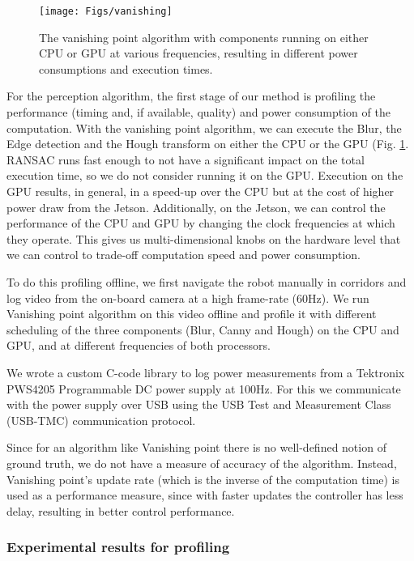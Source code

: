 \begin{figure}
	\centering
	\texttt{[image: Figs/vanishing]}
	\caption{The vanishing point algorithm with components running on either CPU or GPU at various frequencies, resulting in different power consumptions and execution times.}
	\label{fig:vanishing}		
\end{figure}

For the perception algorithm, the first stage of our method is profiling the performance (timing and, if available, quality) and power consumption of the computation. With the vanishing point algorithm, we can execute the Blur, the Edge detection and the Hough transform on either the CPU or the GPU (Fig. \ref{fig:vanishing}. RANSAC runs fast enough to not have a significant impact on the total execution time, so we do not consider running it on the GPU. Execution on the GPU results, in general, in a speed-up over the CPU but at the cost of higher power draw from the Jetson. Additionally, on the Jetson, we can control the performance of the CPU and GPU by changing the clock frequencies at which they operate. This gives us multi-dimensional knobs on the hardware level that we can control to trade-off computation speed and power consumption.

To do this profiling offline, we first navigate the robot manually in corridors and log video from the on-board camera at a high frame-rate (60Hz). 
We run Vanishing point algorithm on this video offline and profile it with different scheduling of the three components (Blur, Canny and Hough) on the CPU and GPU, and at different frequencies of both processors.

We wrote a custom C-code library to log power measurements from a Tektronix PWS4205 Programmable DC power supply at 100Hz. 
For this we communicate with the power supply over USB using the USB Test and Measurement Class (USB-TMC) communication protocol. 
 
Since for an algorithm like Vanishing point there is no well-defined notion of ground truth, we do not have a measure of accuracy of the algorithm. 
Instead, Vanishing point's update rate (which is the inverse of the computation time) is used as a performance measure, since with faster updates the controller has less delay, resulting in better control performance. 

\subsubsection{Experimental results for profiling}

